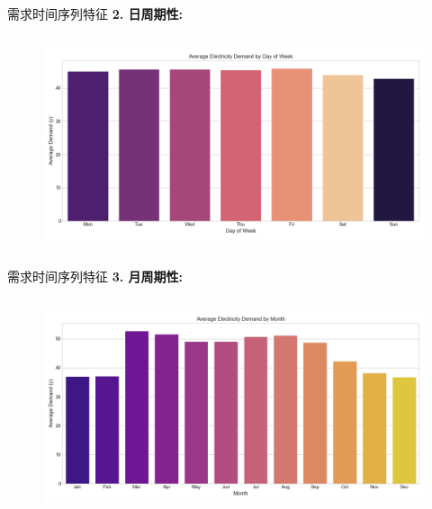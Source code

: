 \documentclass{beamer} %
\begin{document}
\begin{frame}{需求时间序列特征}
    \textbf{2. 日周期性:}
    \begin{columns}
        \begin{column}{0.9\textwidth}
            \centering
            \begin{figure}
                \includegraphics[width=\textwidth]{../plots/avg_demand_by_dayofweek_spark.png}
            \end{figure}
        \end{column}
    \end{columns}
\end{frame}

\begin{frame}{需求时间序列特征}
    \textbf{3. 月周期性:}
    \begin{columns}
        \begin{column}{0.9\textwidth}
            \centering
            \begin{figure}
                \includegraphics[width=\textwidth]{../plots/avg_demand_by_month_spark.png}
            \end{figure}
        \end{column}
    \end{columns}
\end{frame}
\end{document}
